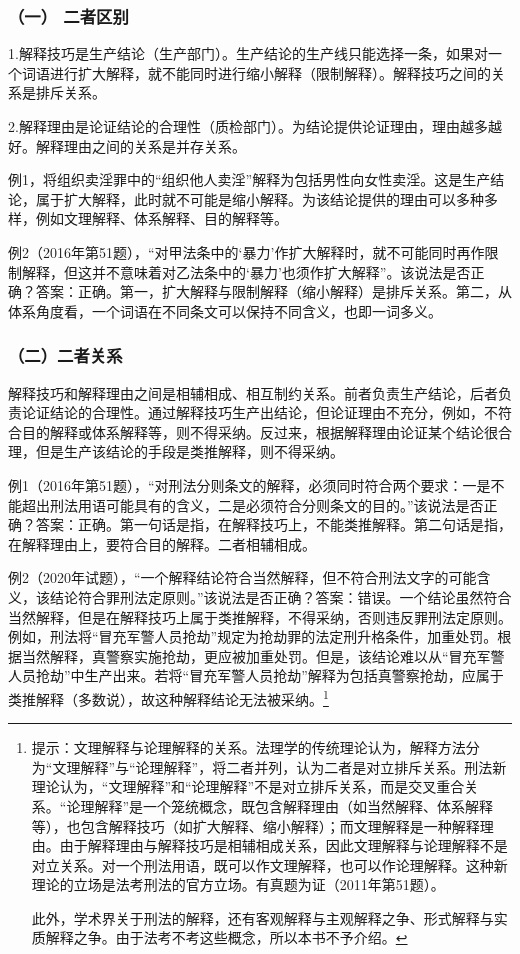 \subsubsection*{（一） 二者区别}

1.解释技巧是生产结论（生产部门）。生产结论的生产线只能选择一条，如果对一个词语进行扩大解释，就不能同时进行缩小解释（限制解释）。解释技巧之间的关系是排斥关系。

2.解释理由是论证结论的合理性（质检部门）。为结论提供论证理由，理由越多越好。解释理由之间的关系是并存关系。

例1，将组织卖淫罪中的“组织他人卖淫”解释为包括男性向女性卖淫。这是生产结论，属于扩大解释，此时就不可能是缩小解释。为该结论提供的理由可以多种多样，例如文理解释、体系解释、目的解释等。

例2（2016年第51题），“对甲法条中的‘暴力’作扩大解释时，就不可能同时再作限制解释，但这并不意味着对乙法条中的‘暴力’也须作扩大解释”。该说法是否正确？答案：正确。第一，扩大解释与限制解释（缩小解释）是排斥关系。第二，从体系角度看，一个词语在不同条文可以保持不同含义，也即一词多义。

\subsubsection*{（二）二者关系}

解释技巧和解释理由之间是相辅相成、相互制约关系。前者负责生产结论，后者负责论证结论的合理性。通过解释技巧生产出结论，但论证理由不充分，例如，不符合目的解释或体系解释等，则不得采纳。反过来，根据解释理由论证某个结论很合理，但是生产该结论的手段是类推解释，则不得采纳。

例1（2016年第51题），“对刑法分则条文的解释，必须同时符合两个要求：一是不能超出刑法用语可能具有的含义，二是必须符合分则条文的目的。”该说法是否正确？答案：正确。第一句话是指，在解释技巧上，不能类推解释。第二句话是指，在解释理由上，要符合目的解释。二者相辅相成。

例2（2020年试题），“一个解释结论符合当然解释，但不符合刑法文字的可能含义，该结论符合罪刑法定原则。”该说法是否正确？答案：错误。一个结论虽然符合当然解释，但是在解释技巧上属于类推解释，不得采纳，否则违反罪刑法定原则。例如，刑法将“冒充军警人员抢劫”规定为抢劫罪的法定刑升格条件，加重处罚。根据当然解释，真警察实施抢劫，更应被加重处罚。但是，该结论难以从“冒充军警人员抢劫”中生产出来。若将“冒充军警人员抢劫”解释为包括真警察抢劫，应属于类推解释（多数说），故这种解释结论无法被采纳。\footnote{提示：文理解释与论理解释的关系。法理学的传统理论认为，解释方法分为“文理解释”与“论理解释”，将二者并列，认为二者是对立排斥关系。刑法新理论认为，“文理解释”和“论理解释”不是对立排斥关系，而是交叉重合关系。“论理解释”是一个笼统概念，既包含解释理由（如当然解释、体系解释等），也包含解释技巧（如扩大解释、缩小解释）；而文理解释是一种解释理由。由于解释理由与解释技巧是相辅相成关系，因此文理解释与论理解释不是对立关系。对一个刑法用语，既可以作文理解释，也可以作论理解释。这种新理论的立场是法考刑法的官方立场。有真题为证（2011年第51题）。

此外，学术界关于刑法的解释，还有客观解释与主观解释之争、形式解释与实质解释之争。由于法考不考这些概念，所以本书不予介绍。}

